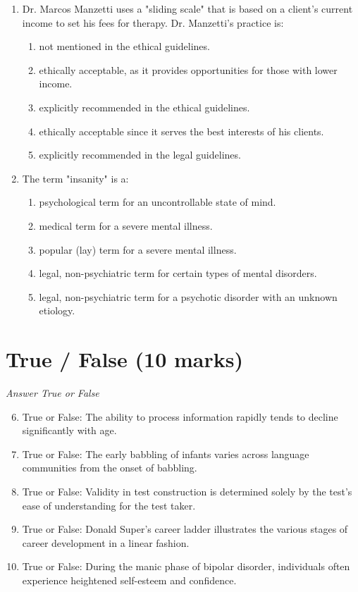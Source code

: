 \documentclass[12pt]{article}
\begin{document}
\begin{enumerate}[label=\arabic*.]
\item Dr. Marcos Manzetti uses a "sliding scale" that is based on a client's current income to set his fees for therapy. Dr. Manzetti's practice is:
\begin{enumerate}[label=(\alph*)]
    \item not mentioned in the ethical guidelines.
    \item ethically acceptable, as it provides opportunities for those with lower income.
    \item explicitly recommended in the ethical guidelines.
    \item ethically acceptable since it serves the best interests of his clients.
    \item explicitly recommended in the legal guidelines.
\end{enumerate}
\item The term "insanity" is a:
\begin{enumerate}[label=(\alph*)]
    \item psychological term for an uncontrollable state of mind.
    \item medical term for a severe mental illness.
    \item popular (lay) term for a severe mental illness.
    \item legal, non-psychiatric term for certain types of mental disorders.
    \item legal, non-psychiatric term for a psychotic disorder with an unknown etiology.
\end{enumerate}
\end{enumerate}

\section*{True / False (10 marks)}
\textit{Answer True or False}
\begin{enumerate}[label=\arabic*.]
\setcounter{enumi}{5}
\item True or False: The ability to process information rapidly tends to decline significantly with age.
\item True or False: The early babbling of infants varies across language communities from the onset of babbling.
\item True or False: Validity in test construction is determined solely by the test's ease of understanding for the test taker.
\item True or False: Donald Super's career ladder illustrates the various stages of career development in a linear fashion.
\item True or False: During the manic phase of bipolar disorder, individuals often experience heightened self-esteem and confidence.
\end{enumerate}
\end{document}
